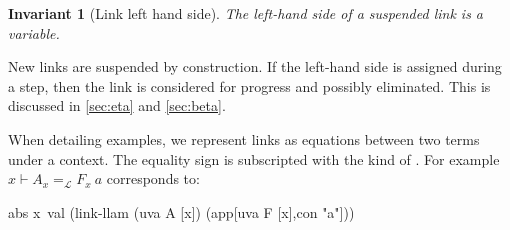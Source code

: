 \documentclass[sigconf,natbib=false,review]{acmart}
\newtheorem{invariant}{Invariant}
\newcommand{\llambda}{\ensuremath{\mathcal{L}}\xspace}
\newcommand{\linkbetaM}[3]{\ensuremath{#1 \vdash #2 =_{\llambda} #3}}
\begin{document}
\begin{invariant}[Link left hand side]\label{inv:linklhs}
  The left-hand side of a suspended link
  is a variable.
\end{invariant}

\noindent
New links are suspended by construction.
If the left-hand side is assigned during a step, then 
the link is considered for progress and possibly eliminated.
This is discussed in \cref{sec:eta} and \cref{sec:beta}.

When detailing examples, we represent links as equations between two
terms under a context.
The equality sign is subscripted with the
kind of . For example $\linkbetaM{x}{A_x}{F_x~a}$ corresponds to:
\begin{elpicode}
abs x\ val (link-llam (uva A [x]) (app[uva F [x],con "a"]))
\end{elpicode}





\end{document}
